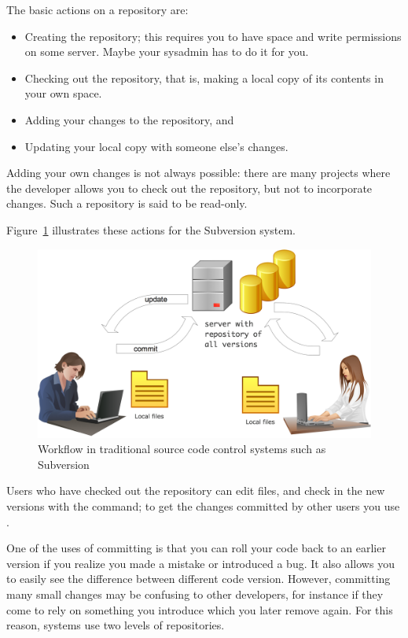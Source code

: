 The basic actions on a repository are:
\begin{itemize}
\item Creating the repository; this requires you to have space and
  write permissions on some server. Maybe your sysadmin has to do it
  for you.
\item Checking out the repository, that is, making a local copy of its
  contents in your own space.
\item\label{it:commit} Adding your changes to the repository, and
\item Updating your local copy with someone else's changes.
\end{itemize}
Adding your own changes is not always possible: there are many projects
where the developer allows you to check out the repository, but not to
incorporate changes. Such a repository is said to be read-only.

Figure~\ref{fig:svn} illustrates these actions for the Subversion system.
\begin{figure}[ht]
\includegraphics[scale=.17]{graphics-public/repo-flow-svn}
\caption{Workflow in traditional source code control systems such as Subversion}
\label{fig:svn}
\end{figure}
Users who have checked out the repository can edit files, and check in
the new versions with the  command; to get the changes
committed by other users you use .

One of the uses of committing is that you can roll your code back to
an earlier version if you realize you made a mistake or introduced a
bug. It also allows you to easily see the difference between different
code version. However, committing many small changes may be confusing
to other developers, for instance if they come to rely on something
you introduce which you later remove again. For this reason,
 systems use two levels
of repositories.

